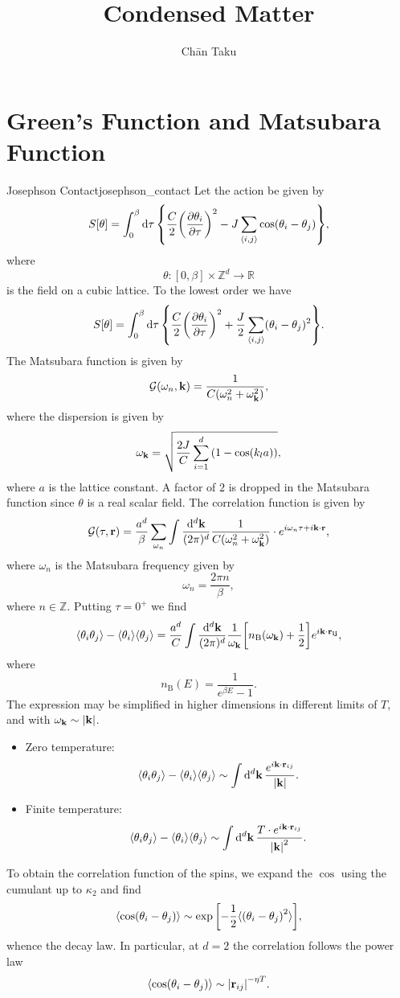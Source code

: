 \documentclass{article}
\title{Condensed Matter}
\author{Ch\=an Taku}
\begin{document}
\maketitle
\section{Green's Function and Matsubara Function}

\begin{example}{Josephson Contact}{josephson_contact}
    Let the action be given by
    \[ S[\theta] = \int_0^\beta \dd{\tau} \qty{ \frac{C}{2}\qty(\pdv{\theta_i}{\tau})^2 - J \sum_{\langle i,j \rangle} \cos(\theta_i - \theta_j) }, \]
    where
    \[ \theta: [0,\beta] \times \mathbb{Z}^d \rightarrow \mathbb{R} \]
    is the field on a cubic lattice. To the lowest order we have
    \[ S[\theta] = \int_0^\beta \dd{\tau} \qty{ \frac{C}{2}\qty(\pdv{\theta_i}{\tau})^2 + \frac{J}{2} \sum_{\langle i,j \rangle} (\theta_i - \theta_j)^2 }. \]
    The Matsubara function is given by
    \[ \mathcal{G}(\omega_n, \vb{k}) = \frac{1}{C(\omega_n^2 + \omega_{\vb{k}}^2)}, \]
    where the dispersion is given by
    \[ \omega_{\vb{k}} = \sqrt{\frac{2J}{C} \sum_{i=1}^d \qty(1 - \cos (k_l a))}, \]
    where $a$ is the lattice constant.
    A factor of $2$ is dropped in the Matsubara function since $\theta$ is a real scalar field.
    The correlation function is given by
    \[ \mathcal{G}(\tau, \vb{r}) = \frac{a^d}{\beta} \sum_{\omega_n} \int \frac{\dd{^d \vb{k}}}{(2\pi)^d} \frac{1}{C(\omega_n^2 + \omega_{\vb{k}}^2)} \cdot e^{i \omega_n \tau + i \vb{k} \cdot \vb{r}}, \]
    where $\omega_n$ is the Matsubara frequency given by
    \[ \omega_n = \frac{2\pi n}{\beta}, \]
    where $n\in \mathbb{Z}$.
    Putting $\tau = 0^+$ we find
    \[ \langle \theta_i \theta_j \rangle - \langle \theta_i \rangle \langle \theta_j \rangle = \frac{a^d}{C} \int \frac{\dd{^d \vb{k}}}{(2\pi)^d} \frac{1}{\omega_{\vb{k}}}\qty[n_{\mathrm{B}}(\omega_{\vb{k}}) + \frac{1}{2}] e^{i\vb{k}\cdot \vb{r_{ij}}}, \]
    where
    \[ n_{\mathrm{B}}(E) = \frac{1}{e^{\beta E} - 1}. \]
    The expression may be simplified in higher dimensions in different limits of $T$, and with $\omega_{\vb{k}} \sim \abs{\vb{k}}$.
    \begin{itemize}
        \item Zero temperature:
        \[ \langle \theta_i \theta_j \rangle - \langle \theta_i \rangle \langle \theta_j \rangle \sim \int \dd{^d \vb{k}} \frac{e^{i \vb{k}\cdot \vb{r}_{ij}}}{\abs{\vb{k}}}. \]
        \item Finite temperature:
        \[ \langle \theta_i \theta_j \rangle - \langle \theta_i \rangle \langle \theta_j \rangle \sim \int \dd{^d \vb{k}} \frac{T\cdot e^{i \vb{k}\cdot \vb{r}_{ij}}}{\abs{\vb{k}}^2}. \]
    \end{itemize}
    To obtain the correlation function of the spins, we expand the $\cos$ using the cumulant up to $\kappa_2$ and find
    \[ \langle \cos(\theta_i - \theta_j) \rangle \sim \exp\qty[-\frac{1}{2}\langle \qty(\theta_i - \theta_j)^2 \rangle], \]
    whence the decay law.
    In particular, at $d=2$ the correlation follows the power law
    \[ \langle \cos(\theta_i - \theta_j) \rangle \sim \abs{\vb{r}_{ij}}^{-\eta T}. \]
\end{example}
\end{document}
